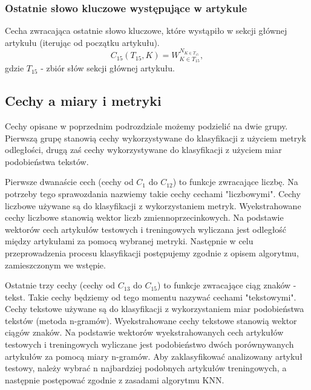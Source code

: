 \documentclass{classrep}
\begin{document}
\subsubsection{Ostatnie słowo kluczowe występujące w artykule}
Cecha zwracająca ostatnie słowo kluczowe, które wystąpiło w sekcji głównej artykułu (iterując od początku artykułu).
\begin{equation}
            C_{15}(T_{15},K) = W^{N_{K \in T_{15}}}_{K \in T_{15}},
 \end{equation}	
 gdzie $T_{15}$ - zbiór słów sekcji głównej artykułu.\newline\newline

\subsection{Cechy a miary i metryki}

Cechy opisane w poprzednim podrozdziale możemy podzielić na dwie grupy. Pierwszą grupę stanowią cechy wykorzystywane do klasyfikacji z użyciem metryk odległości, drugą zaś cechy wykorzystywane do klasyfikacji z użyciem miar podobieństwa tekstów. \newline

Pierwsze dwanaście cech (cechy od $C_1$ do $C_{12}$) to funkcje zwracające liczbę. Na potrzeby tego sprawozdania nazwiemy takie cechy cechami "liczbowymi". Cechy liczbowe używane są do klasyfikacji z wykorzystaniem metryk. Wyekstrahowane cechy liczbowe stanowią wektor liczb zmiennoprzecinkowych. Na podstawie wektorów cech artykułów testowych i treningowych wyliczana jest odległość między artykułami za pomocą wybranej metryki. Następnie w celu przeprowadzenia procesu klasyfikacji postępujemy zgodnie z opisem algorytmu, zamieszczonym we wstępie. \newline

Ostatnie trzy cechy (cechy od $C_{13}$ do $C_{15}$) to funkcje zwracające ciąg znaków - tekst. Takie cechy będziemy od tego momentu nazywać cechami "tekstowymi". Cechy tekstowe używane są do klasyfikacji z wykorzystaniem miar podobieństwa tekstów (metoda n-gramów). Wyekstrahowane cechy tekstowe stanowią wektor ciągów znaków. Na podstawie wektorów wyekstrahowanych cech artykułów testowych i treningowych wyliczane jest podobieństwo dwóch porównywanych artykułów za pomocą miary n-gramów. Aby zaklasyfikować analizowany artykuł testowy, należy wybrać n najbardziej podobnych artykułów treningowych, a następnie postępować zgodnie z zasadami algorytmu KNN. \newline
\end{document}
